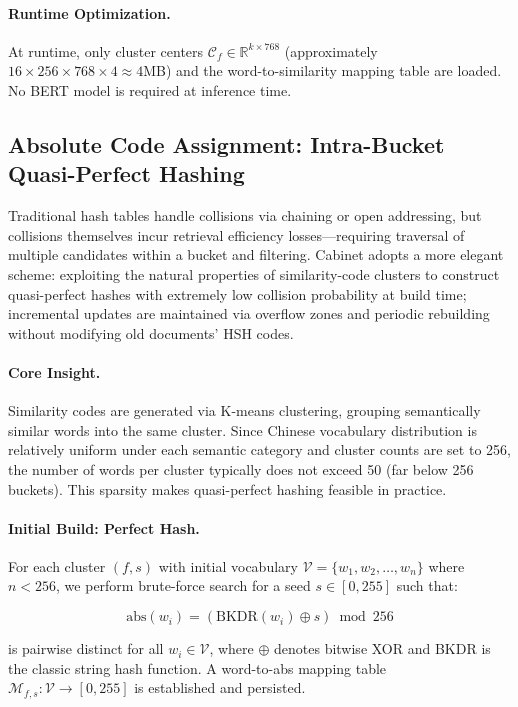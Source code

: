 \documentclass[11pt,a4paper]{article}
\theoremstyle{definition}
\begin{document}
\paragraph{Runtime Optimization.} At runtime, only cluster centers $\mathcal{C}_f \in \mathbb{R}^{k \times 768}$ (approximately $16 \times 256 \times 768 \times 4 \approx 4$MB) and the word-to-similarity mapping table are loaded. No BERT model is required at inference time.

\subsection{Absolute Code Assignment: Intra-Bucket Quasi-Perfect Hashing}
\label{sec:abs}

Traditional hash tables handle collisions via chaining or open addressing, but collisions themselves incur retrieval efficiency losses---requiring traversal of multiple candidates within a bucket and filtering. Cabinet adopts a more elegant scheme: exploiting the natural properties of similarity-code clusters to construct quasi-perfect hashes with extremely low collision probability at build time; incremental updates are maintained via overflow zones and periodic rebuilding without modifying old documents' HSH codes.

\paragraph{Core Insight.} Similarity codes are generated via K-means clustering, grouping semantically similar words into the same cluster. Since Chinese vocabulary distribution is relatively uniform under each semantic category and cluster counts are set to 256, the number of words per cluster typically does not exceed 50 (far below 256 buckets). This sparsity makes quasi-perfect hashing feasible in practice.

\paragraph{Initial Build: Perfect Hash.} For each cluster $(f, s)$ with initial vocabulary $\mathcal{V} = \{w_1, w_2, \ldots, w_n\}$ where $n < 256$, we perform brute-force search for a seed $s \in [0, 255]$ such that:

\begin{equation}
\text{abs}(w_i) = (\text{BKDR}(w_i) \oplus s) \bmod 256
\label{eq:abs}
\end{equation}

is pairwise distinct for all $w_i \in \mathcal{V}$, where $\oplus$ denotes bitwise XOR and BKDR is the classic string hash function. A word-to-abs mapping table $\mathcal{M}_{f,s}: \mathcal{V} \rightarrow [0, 255]$ is established and persisted.
\end{document}
